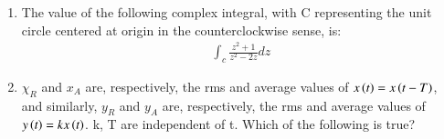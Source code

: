 \documentclass[journal,12pt,onecolumn]{IEEEtran}
\theoremstyle{remark}
\begin{document}
\begin{enumerate}[start=1, label=Q.\arabic*]
\hfill{}

\item The value of the following complex integral, with C representing the unit circle centered at origin in the counterclockwise sense, is:
\begin{align*}
\int_{c}\frac{z^{2}+1}{z^{2}-2z}dz
\end{align*}
    \begin{enumerate}
    \end{enumerate}

\hfill{}

\item $\chi_{R}$ and $x_{A}$ are, respectively, the rms and average values of $x\left(t\right)=x\left(t-T\right)$, and similarly, $y_{R}$ and $y_{A}$ are, respectively, the rms and average values of $y\left(t\right)=kx\left(t\right)$. k, T are independent of t. Which of the following is true?
    \begin{enumerate}
    \end{enumerate}

\hfill{}


\end{enumerate}
\end{document}
